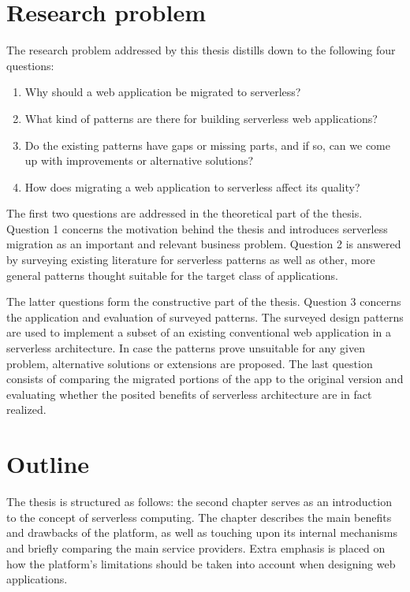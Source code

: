 \section{Research problem}

The research problem addressed by this thesis distills down to the following four questions:
\begin{enumerate}
	\item Why should a web application be migrated to serverless?
	\item What kind of patterns are there for building serverless web applications?
	\item Do the existing patterns have gaps or missing parts, and if so, can we come up with improvements or alternative solutions?
	\item How does migrating a web application to serverless affect its quality?
\end{enumerate}

The first two questions are addressed in the theoretical part of the thesis. Question 1 concerns the motivation behind the thesis and introduces serverless migration as an important and relevant business problem. Question 2 is answered by surveying existing literature for serverless patterns as well as other, more general patterns thought suitable for the target class of applications.

The latter questions form the constructive part of the thesis. Question 3 concerns the application and evaluation of surveyed patterns. The surveyed design patterns are used to implement a subset of an existing conventional web application in a serverless architecture. In case the patterns prove unsuitable for any given problem, alternative solutions or extensions are proposed. The last question consists of comparing the migrated portions of the app to the original version and evaluating whether the posited benefits of serverless architecture are in fact realized.

\section{Outline}

The thesis is structured as follows: the second chapter serves as an introduction to the concept of serverless computing. The chapter describes the main benefits and drawbacks of the platform, as well as touching upon its internal mechanisms and briefly comparing the main service providers. Extra emphasis is placed on how the platform's limitations should be taken into account when designing web applications.

